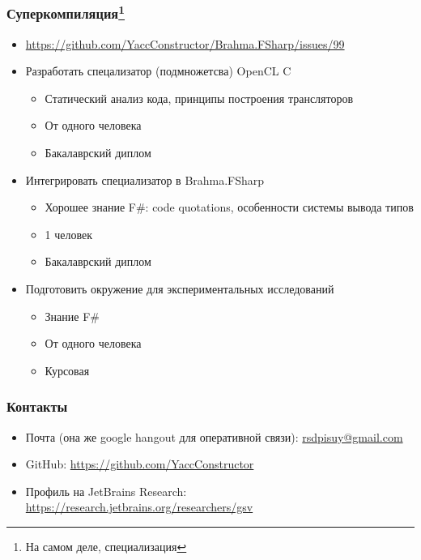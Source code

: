 \documentclass{beamer}
\begin{document}
\begin{frame}[fragile]
\transwipe[direction=90]
\frametitle{Суперкомпиляция\footnote{На самом деле, специализация}}
  \begin{itemize}
    \item \footnotesize{\url{https://github.com/YaccConstructor/Brahma.FSharp/issues/99}}
    \item Разработать спецализатор (подмножетсва) OpenCL C
    \begin{itemize}
       \item Статический анализ кода, принципы построения трансляторов
       \item От одного человека
       \item Бакалаврский диплом
    \end{itemize}
    \item Интегрировать специализатор в Brahma.FSharp
    \begin{itemize}
       \item Хорошее знание F\#: code quotations, особенности системы вывода типов
       \item 1 человек
       \item Бакалаврский диплом
    \end{itemize}
    \item Подготовить окружение для экспериментальных исследований
    \begin{itemize}
       \item Знание F\# 
       \item От одного человека
       \item Курсовая
    \end{itemize}
  \end{itemize}  
\end{frame}


\begin{frame}
\transwipe[direction=90]
\frametitle{Контакты}
\begin{itemize}
  \item Почта (она же google hangout для оперативной связи): \url{rsdpisuy@gmail.com}
  \item GitHub: \url{https://github.com/YaccConstructor}
  \item Профиль на JetBrains Research: \url{https://research.jetbrains.org/researchers/gsv}
\end{itemize}
\end{frame}
\end{document}
